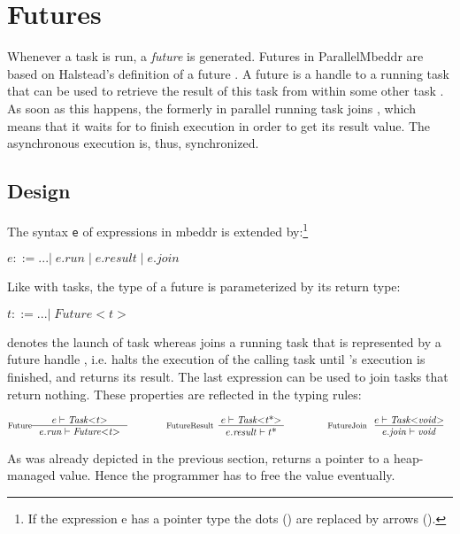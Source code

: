 \section{Futures}
Whenever a task  is run, a \textit{future} is generated. Futures in ParallelMbeddr are based on Halstead's definition of a future \cite{Halstead_Multilisp}. A future is a handle to a running task that can be used to retrieve the result of this task from within some other task . As soon as this happens, the formerly in parallel running task  joins , which means that it waits for  to finish execution in order to get its result value. The asynchronous execution is, thus, synchronized.

\subsection{Design}
The syntax \texttt{e} of expressions in mbeddr is extended by:\footnote{If the expression e has a pointer type the dots () are replaced by arrows (\CODE{->}).}

$ e ::= ...|\;e.\mathit{run}\;|\;e.\mathit{result}\;|\;e.\mathit{join} $

Like with tasks, the type of a future is parameterized by its return type:

$ t ::= ...|\;\mathit{Future{<}t{>}}$

 denotes the launch of task  whereas  joins a running task that is represented by a future handle , i.e. halts the execution of the calling task until 's execution is finished, and returns its result. The last expression  can be used to join tasks that return nothing. These properties are reflected in the typing rules:

\begin{center}
\begin{align*}
\inference*[Future]{e |- \mathit{Task{<}t{>}}}{e.\mathit{run} |- \mathit{Future{<}t{>}}}
\qquad\qquad
\inference*[FutureResult]{e |- \mathit{Task{<}t\text{*}{>}}}{e.\mathit{result} |- t\text{*}}
\qquad\qquad
\inference*[FutureJoin]{e |- \mathit{Task{<}void{>}}}{e.\mathit{join} |- \mathit{void}}
\end{align*}
\end{center}

As was already depicted in the previous section,  
 returns a pointer to a heap-managed value. Hence the programmer has to free the value eventually.

